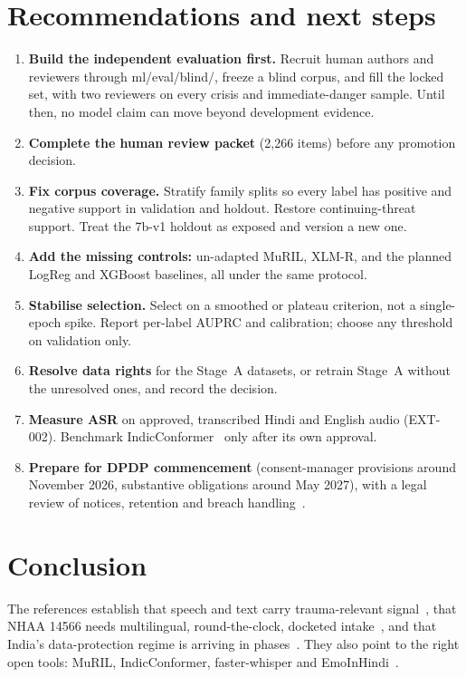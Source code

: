 \documentclass[11pt,a4paper]{article}
\newcommand{\codeus}{\textunderscore\allowbreak}
\DeclareRobustCommand{\code}[1]{{\ttfamily\let\_\codeus #1}}
\begin{document}
\section{Recommendations and next steps}
\label{sec:next}
\begin{enumerate}
  \item \textbf{Build the independent evaluation first.} Recruit human authors and reviewers through
        \code{ml/eval/blind/}, freeze a blind corpus, and fill the locked set, with two reviewers on
        every crisis and immediate-danger sample. Until then, no model claim can move beyond
        development evidence.
  \item \textbf{Complete the human review packet} (2{,}266 items) before any promotion decision.
  \item \textbf{Fix corpus coverage.} Stratify family splits so every label has positive and
        negative support in validation and holdout. Restore continuing-threat support. Treat the
        \code{7b-v1} holdout as exposed and version a new one.
  \item \textbf{Add the missing controls:} un-adapted MuRIL, XLM-R, and the planned LogReg and
        XGBoost baselines, all under the same protocol.
  \item \textbf{Stabilise selection.} Select on a smoothed or plateau criterion, not a single-epoch
        spike. Report per-label AUPRC and calibration; choose any threshold on validation only.
  \item \textbf{Resolve data rights} for the Stage~A datasets, or retrain Stage~A without the
        unresolved ones, and record the decision.
  \item \textbf{Measure ASR} on approved, transcribed Hindi and English audio (EXT-002). Benchmark
        IndicConformer~\cite{ai4bharat} only after its own approval.
  \item \textbf{Prepare for DPDP commencement} (consent-manager provisions around November 2026,
        substantive obligations around May 2027), with a legal review of notices, retention and
        breach handling~\cite{meity2023}.
\end{enumerate}

\section{Conclusion}
The references establish that speech and text carry trauma-relevant signal~\cite{hu2024,islam2024},
that NHAA 14566 needs multilingual, round-the-clock, docketed intake~\cite{pib2021}, and that India's
data-protection regime is arriving in phases~\cite{meity2023}. They also point to the right open
tools: MuRIL, IndicConformer, faster-whisper and EmoInHindi~\cite{khanuja2021,ai4bharat,systran,singh2022}.
\end{document}
